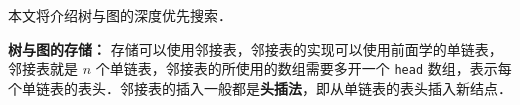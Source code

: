 
\begin{issues}
\issueTODO
\end{issues}

本文将介绍树与图的深度优先搜索．

\textbf{树与图的存储：}
存储可以使用邻接表，邻接表的实现可以使用前面学的单链表，邻接表就是 $n$ 个单链表，邻接表的所使用的数组需要多开一个 \verb|head| 数组，表示每个单链表的表头．邻接表的插入一般都是\textbf{头插法}，即从单链表的表头插入新结点．